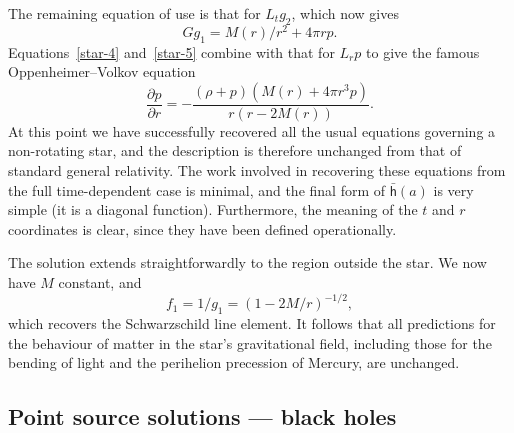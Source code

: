 \documentclass[a4paper]{article}
\numberwithin{equation}{section}
\newcommand{\lbh}{\bar{\mathsf{h}}}
\newcommand{\ho}{\lbh}
\newcommand{\deriv}[2]{\frac{\partial #1}{\partial #2}}
\begin{document}
The remaining equation of use is that for $L_t g_2$, which now gives
%
\begin{equation}
G g_1 = M(r)/r^2 + 4\pi r p.
\label{star-5}
\end{equation}
%
Equations~\eqref{star-4} and~\eqref{star-5} combine with that for $L_r p$
to give the famous Oppen\-heimer--Volkov equation
%
\begin{equation}
\deriv{p}{r} = - \frac{(\rho + p)(M(r) + 4\pi r^3 p)}{r(r-2M(r))}. 
\label{star-OV}
\end{equation}
%
At this point we have successfully recovered all the usual equations
governing a non-rotating star, and the description is therefore
unchanged from that of standard general relativity.  The work involved
in recovering these equations from the full time-dependent case is
minimal, and the final form of $\ho(a)$ is very simple (it is a
diagonal function).  Furthermore, the meaning of the $t$ and $r$
coordinates is clear, since they have been defined operationally.


The solution extends straightforwardly to the region outside the star.
We now have $M$ constant, and
%
\begin{equation}
f_1 = 1/g_1 = (1-2M/r)^{-1/2},
\end{equation}
%
which recovers the Schwarzschild line element.  It follows that all
predictions for the behaviour of matter in the star's gravitational
field, including those for the bending of light and the perihelion
precession of Mercury, are unchanged.



\subsection{Point source solutions --- black holes}
\label{SS-BH}
\end{document}
